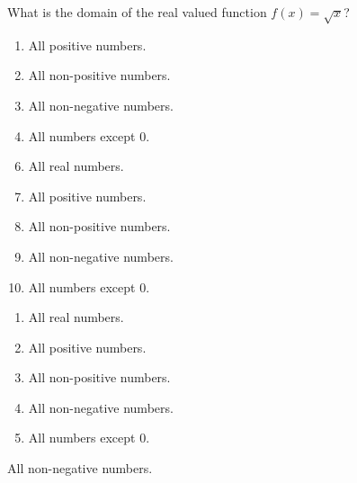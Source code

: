 

 What is the domain of the real valued function $f(x)=\sqrt{x}$?


\ifsat
	\begin{enumerate}[label=\Alph*)]
		\item  All positive numbers.
		\item  All non-positive numbers.
		\item  All non-negative numbers.%
		\item  All numbers except 0.
	\end{enumerate}
\else
\fi

\ifacteven
	\begin{enumerate}[label=\textbf{\Alph*.},itemsep=\fill,align=left]
		\setcounter{enumii}{5}
		\item   All real numbers.
		\item  All positive numbers.
		\item  All non-positive numbers.
		\addtocounter{enumii}{1}
		\item  All non-negative numbers.%
		\item  All numbers except 0.
	\end{enumerate}
\else
\fi

\ifactodd
	\begin{enumerate}[label=\textbf{\Alph*.},itemsep=\fill,align=left]
		\item   All real numbers.
		\item  All positive numbers.
		\item  All non-positive numbers.
		\item  All non-negative numbers.%
		\item  All numbers except 0.
	\end{enumerate}
\else
\fi

\ifgridin
  All non-negative numbers.%
		
\else
\fi

